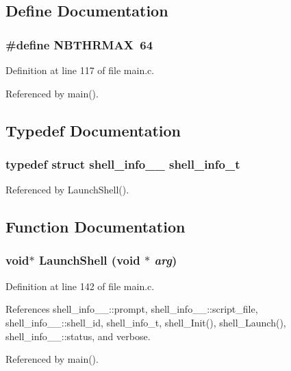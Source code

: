 \subsection{Define Documentation}
\subsubsection{\setlength{\rightskip}{0pt plus 5cm}\#define NBTHRMAX\ 64}\label{main_8c_a0}




Definition at line 117 of file main.c.

Referenced by main().

\subsection{Typedef Documentation}
\subsubsection{\setlength{\rightskip}{0pt plus 5cm}typedef struct {\bf shell\_\-info\_\-\_\-}  {\bf shell\_\-info\_\-t}}\label{main_8c_a2}




Referenced by Launch\-Shell().

\subsection{Function Documentation}
\subsubsection{\setlength{\rightskip}{0pt plus 5cm}void$\ast$ Launch\-Shell (void $\ast$ {\em arg})}\label{main_8c_a5}




Definition at line 142 of file main.c.

References shell\_\-info\_\-\_\-::prompt, shell\_\-info\_\-\_\-::script\_\-file, shell\_\-info\_\-\_\-::shell\_\-id, shell\_\-info\_\-t, shell\_\-Init(), shell\_\-Launch(), shell\_\-info\_\-\_\-::status, and verbose.

Referenced by main().
